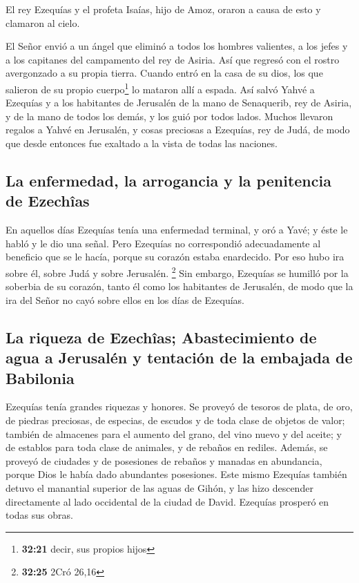 \begin{paracol}{2}
 El rey Ezequías y el profeta Isaías, hijo de Amoz,
oraron a causa de esto y clamaron al cielo.

 El Señor envió a un ángel que eliminó a todos los
hombres valientes, a los jefes y a los capitanes del campamento del rey
de Asiria. Así que regresó con el rostro avergonzado a su propia tierra.
Cuando entró en la casa de su dios, los que salieron de su propio
cuerpo\footnote{\textbf{32:21} decir, sus propios hijos} lo mataron allí
a espada.  Así salvó Yahvé a Ezequías y a los habitantes
de Jerusalén de la mano de Senaquerib, rey de Asiria, y de la mano de
todos los demás, y los guió por todos lados.  Muchos
llevaron regalos a Yahvé en Jerusalén, y cosas preciosas a Ezequías, rey
de Judá, de modo que desde entonces fue exaltado a la vista de todas las
naciones.

\hypertarget{la-enfermedad-la-arrogancia-y-la-penitencia-de-ezechuxeeas}{%
\subsection{La enfermedad, la arrogancia y la penitencia de
Ezechîas}\label{la-enfermedad-la-arrogancia-y-la-penitencia-de-ezechuxeeas}}

 En aquellos días Ezequías tenía una enfermedad terminal,
y oró a Yavé; y éste le habló y le dio una señal.  Pero
Ezequías no correspondió adecuadamente al beneficio que se le hacía,
porque su corazón estaba enardecido. Por eso hubo ira sobre él, sobre
Judá y sobre Jerusalén. \footnote{\textbf{32:25} 2Cró 26,16}
 Sin embargo, Ezequías se humilló por la soberbia de su
corazón, tanto él como los habitantes de Jerusalén, de modo que la ira
del Señor no cayó sobre ellos en los días de Ezequías.

\hypertarget{la-riqueza-de-ezechuxeeas-abastecimiento-de-agua-a-jerusaluxe9n-y-tentaciuxf3n-de-la-embajada-de-babilonia}{%
\subsection{La riqueza de Ezechîas; Abastecimiento de agua a Jerusalén y
tentación de la embajada de
Babilonia}\label{la-riqueza-de-ezechuxeeas-abastecimiento-de-agua-a-jerusaluxe9n-y-tentaciuxf3n-de-la-embajada-de-babilonia}}

 Ezequías tenía grandes riquezas y honores. Se proveyó de
tesoros de plata, de oro, de piedras preciosas, de especias, de escudos
y de toda clase de objetos de valor;  también de
almacenes para el aumento del grano, del vino nuevo y del aceite; y de
establos para toda clase de animales, y de rebaños en rediles.
 Además, se proveyó de ciudades y de posesiones de
rebaños y manadas en abundancia, porque Dios le había dado abundantes
posesiones.  Este mismo Ezequías también detuvo el
manantial superior de las aguas de Gihón, y las hizo descender
directamente al lado occidental de la ciudad de David. Ezequías prosperó
en todas sus obras.


\end{paracol}
